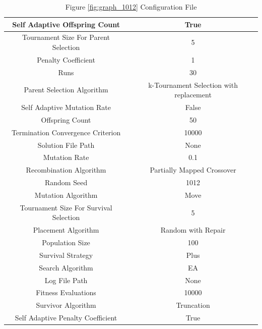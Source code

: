 \documentclass{standalone}
\begin{document}
\begin{table}[!htb]
	\centering
	\caption{Figure \ref{fig:graph_1012} Configuration File}
	\label{tab:graph_1012}
	\begin{tabular}{| c | c |}
		\hline
		Self Adaptive Offspring Count		& True		 \\
		\hline
		Tournament Size For Parent Selection		& 5		 \\
		\hline
		Penalty Coefficient		& 1		 \\
		\hline
		Runs		& 30		 \\
		\hline
		Parent Selection Algorithm		& k-Tournament Selection with replacement		 \\
		\hline
		Self Adaptive Mutation Rate		& False		 \\
		\hline
		Offspring Count		& 50		 \\
		\hline
		Termination Convergence Criterion		& 10000		 \\
		\hline
		Solution File Path		& None		 \\
		\hline
		Mutation Rate		& 0.1		 \\
		\hline
		Recombination Algorithm		& Partially Mapped Crossover		 \\
		\hline
		Random Seed		& 1012		 \\
		\hline
		Mutation Algorithm		& Move		 \\
		\hline
		Tournament Size For Survival Selection		& 5		 \\
		\hline
		Placement Algorithm		& Random with Repair		 \\
		\hline
		Population Size		& 100		 \\
		\hline
		Survival Strategy		& Plus		 \\
		\hline
		Search Algorithm		& EA		 \\
		\hline
		Log File Path		& None		 \\
		\hline
		Fitness Evaluations		& 10000		 \\
		\hline
		Survivor Algorithm		& Truncation		 \\
		\hline
		Self Adaptive Penalty Coefficient		& True		 \\
		\hline
	\end{tabular}
\end{table}
\end{document}
